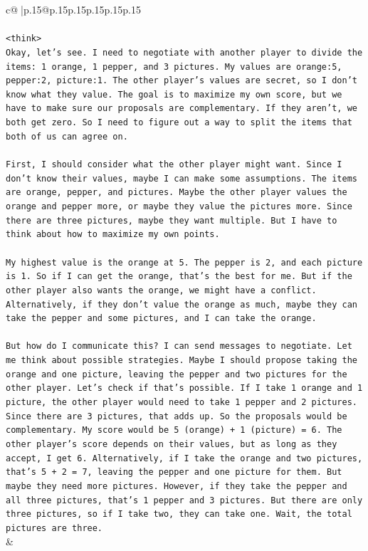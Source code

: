 \documentclass{article}
\begin{document}
{\begin{supertabular}{c@{$\;$}|p{.15\linewidth}@{}p{.15\linewidth}p{.15\linewidth}p{.15\linewidth}p{.15\linewidth}p{.15\linewidth}}
{{{\\ 
\\ 
\texttt{<think>} \\
\texttt{Okay, let's see. I need to negotiate with another player to divide the items: 1 orange, 1 pepper, and 3 pictures. My values are orange:5, pepper:2, picture:1. The other player's values are secret, so I don't know what they value. The goal is to maximize my own score, but we have to make sure our proposals are complementary. If they aren't, we both get zero. So I need to figure out a way to split the items that both of us can agree on.} \\
\\ 
\texttt{First, I should consider what the other player might want. Since I don't know their values, maybe I can make some assumptions. The items are orange, pepper, and pictures. Maybe the other player values the orange and pepper more, or maybe they value the pictures more. Since there are three pictures, maybe they want multiple. But I have to think about how to maximize my own points.} \\
\\ 
\texttt{My highest value is the orange at 5. The pepper is 2, and each picture is 1. So if I can get the orange, that's the best for me. But if the other player also wants the orange, we might have a conflict. Alternatively, if they don't value the orange as much, maybe they can take the pepper and some pictures, and I can take the orange.} \\
\\ 
\texttt{But how do I communicate this? I can send messages to negotiate. Let me think about possible strategies. Maybe I should propose taking the orange and one picture, leaving the pepper and two pictures for the other player. Let's check if that's possible. If I take 1 orange and 1 picture, the other player would need to take 1 pepper and 2 pictures. Since there are 3 pictures, that adds up. So the proposals would be complementary. My score would be 5 (orange) + 1 (picture) = 6. The other player's score depends on their values, but as long as they accept, I get 6. Alternatively, if I take the orange and two pictures, that's 5 + 2 = 7, leaving the pepper and one picture for them. But maybe they need more pictures. However, if they take the pepper and all three pictures, that's 1 pepper and 3 pictures. But there are only three pictures, so if I take two, they can take one. Wait, the total pictures are three.} \\
            }
        }
    }
    & \\ \\


\end{supertabular}}
\end{document}
